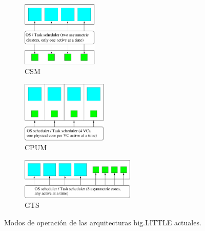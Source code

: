 \begin{figure}%
 \centering
  \begin{subfigure}{.75\textwidth}
   \centering
   \includegraphics[width=0.4\textwidth]{Figures/Models/clustered.pdf}
   \caption{CSM}
  \end{subfigure}

	\medskip

  \begin{subfigure}{.75\textwidth}
   \centering
   \includegraphics[width=0.45\textwidth]{Figures/Models/iks.pdf}
   \caption{CPUM}
  \end{subfigure}

	\medskip

  \begin{subfigure}{.75\textwidth}
   \centering
   \includegraphics[width=0.6\textwidth]{Figures/Models/gts.pdf}
   \caption{GTS}
  \end{subfigure}
   \caption{Modos de operación de las arquitecturas big.LITTLE actuales.}
   \label{fig:modes}
\end{figure}


